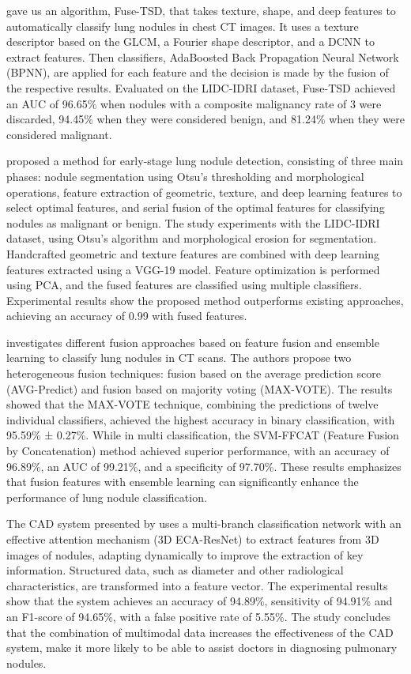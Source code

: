 \citet{Yutong2018} gave us an algorithm, Fuse-TSD, that takes texture, shape, and deep features to automatically classify lung nodules in chest CT images. It uses a texture descriptor based on the GLCM, a Fourier shape descriptor, and a DCNN to extract features. Then classifiers, AdaBoosted Back Propagation Neural Network (BPNN), are applied for each feature and the decision is made by the fusion of the respective results. Evaluated on the LIDC-IDRI dataset, Fuse-TSD achieved an AUC of 96.65\% when nodules with a composite malignancy rate of 3 were discarded, 94.45\% when they were considered benign, and 81.24\% when they were considered malignant.

\citet{Saba2019} proposed a method for early-stage lung nodule detection, consisting of three main phases: nodule segmentation using Otsu's thresholding and morphological operations, feature extraction of geometric, texture, and deep learning features to select optimal features, and serial fusion of the optimal features for classifying nodules as malignant or benign. The study experiments with the LIDC-IDRI dataset, using Otsu's algorithm and morphological erosion for segmentation. Handcrafted geometric and texture features are combined with deep learning features extracted using a VGG-19 model. Feature optimization is performed using PCA, and the fused features are classified using multiple classifiers. Experimental results show the proposed method outperforms existing approaches, achieving an accuracy of 0.99 with fused features.

\citet{Muzammil2021} investigates different fusion approaches based on feature fusion and ensemble learning to classify lung nodules in CT scans. The authors propose two heterogeneous fusion techniques: fusion based on the average prediction score (AVG-Predict) and fusion based on majority voting (MAX-VOTE). The results showed that the MAX-VOTE technique, combining the predictions of twelve individual classifiers, achieved the highest accuracy in binary classification, with 95.59\% ± 0.27\%. While in multi classification, the SVM-FFCAT (Feature Fusion by Concatenation) method achieved superior performance, with an accuracy of 96.89\%, an AUC of 99.21\%, and a specificity of 97.70\%. These results emphasizes that fusion features with ensemble learning can significantly enhance the performance of lung nodule classification.

The CAD system presented by \citet{Yuan2022} uses a multi-branch classification network with an effective attention mechanism (3D ECA-ResNet) to extract features from 3D images of nodules, adapting dynamically to improve the extraction of key information. Structured data, such as diameter and other radiological characteristics, are transformed into a feature vector. The experimental results show that the system achieves an accuracy of 94.89\%, sensitivity of 94.91\% and an F1-score of 94.65\%, with a false positive rate of 5.55\%. The study concludes that the combination of multimodal data increases the effectiveness of the CAD system, make it more likely to be able to assist doctors in diagnosing pulmonary nodules. 

